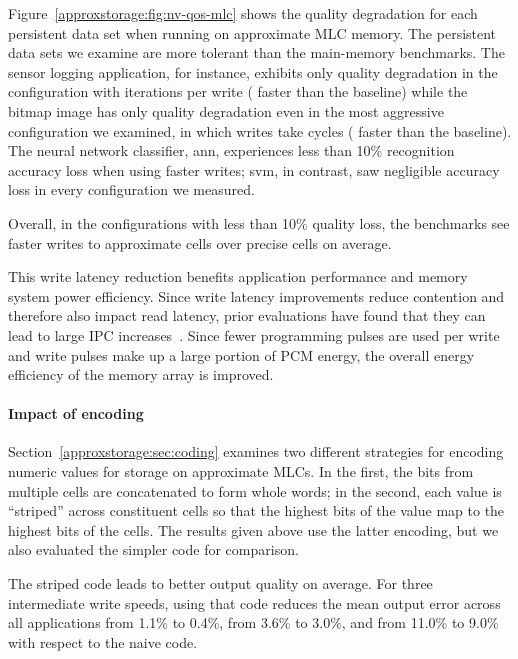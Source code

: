 Figure~\ref{approxstorage:fig:nv-qos-mlc} shows the quality degradation for each
persistent data set when running on approximate MLC memory. The
persistent data sets we examine are more tolerant than the
main-memory benchmarks. The sensor logging application, for instance,
exhibits only  quality degradation in the
configuration with 
iterations per write ( faster than the baseline) while the bitmap
image has only  quality degradation even in the most aggressive
configuration we examined, in which writes take
 cycles (
faster than the baseline).
The neural network classifier, \textsf{ann}, experiences less than 10\%
recognition accuracy loss when using  faster
writes; \textsf{svm}, in contrast, saw negligible accuracy loss in every
configuration we measured.

\vskip 12pt
\noindent
Overall, in the configurations with less than 10\% quality loss, the benchmarks
see  faster writes to approximate cells over precise cells on
average.

This write latency reduction benefits application performance and memory
system power efficiency. Since write latency improvements reduce contention
and therefore also impact read latency, prior evaluations have found that they
can lead to large IPC increases~\cite{improvingwrites,powertokens}. Since fewer
programming pulses are used per write and write pulses make up a large portion
of PCM energy, the overall energy efficiency of the memory array is improved.

\paragraph{Impact of encoding}

Section~\ref{approxstorage:sec:coding} examines two different strategies for encoding
numeric values for storage on approximate MLCs. In the first, the bits from
multiple cells are concatenated to form whole words; in the second, each value
is ``striped'' across constituent cells so that the highest bits of the value
map to the highest bits of the cells. The results given above use
the latter encoding, but we also evaluated the simpler code for comparison.

The striped code leads to better output quality on average.
For three intermediate write speeds, using that code reduces the mean
output error across all applications from 1.1\% to 0.4\%, from 3.6\% to 3.0\%,
and from 11.0\% to 9.0\% with respect to the naive code.


